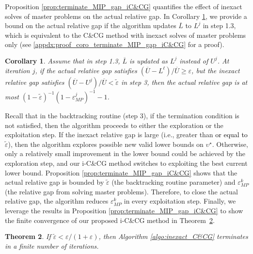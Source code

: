 \documentclass[preprint,review,11pt]{elsarticle}
\newtheorem{thm}{Theorem}
\newtheorem{cor}[thm]{Corollary}
\theoremstyle{definition}
\theoremstyle{remark}
\newcommand{\epst}{\widetilde{\varepsilon}}
\newcommand{\calO}{\mathcal{O}}
\newcommand{\Lbar}{\overline{L}}
\newcommand{\Ubar}{\overline{U}}
\newcommand{\blue}{\textcolor{black}}
\begin{document}
Proposition \ref{prop:terminate_MIP_gap_iC&CG} quantifies the effect of inexact solves of master problems on the actual relative gap. In Corollary \ref{coro:terminate_MIP_gap_iC&CG}, we provide a bound on the actual relative gap if the algorithm updates $\Lbar$ to $L^j$ in step 1.3, which is equivalent to the C\&CG method with inexact solves of master problems only \cite{Tonissen_et_al:2021} (see \ref{appdx:proof_coro_terminate_MIP_gap_iC&CG} for a proof).


\begin{cor}  \label{coro:terminate_MIP_gap_iC&CG}
Assume that in step 1.3, $\Lbar$ is updated as $L^j$ instead of $U^j$. At iteration $j$, if the actual relative gap satisfies $(\Ubar-L^\ell)/\Ubar\geq \varepsilon$, but the inexact relative gap satisfies $(\Ubar-U^j)/\Ubar<\epst$ in step 3, then the actual relative gap is at most $(1-\epst)^{-1}(1-\varepsilon_{MP}^j)^{-1}-1$.%
\end{cor}

Recall that in the backtracking routine (step 3), if the termination condition is not satisfied, then the algorithm proceeds to either the exploration or the exploitation step.  If the inexact relative gap is large (i.e., greater than \blue{or equal to} $\epst$), then the algorithm explores possible new valid lower bounds on $\upsilon^\star$.  Otherwise, only a relatively small improvement in the lower bound could be achieved by the exploration step, and our i-C\&CG method switches to exploiting the best current lower bound. Proposition \ref{prop:terminate_MIP_gap_iC&CG} shows that the actual relative gap is bounded by $\epst$ (the backtracking routine parameter) and $\varepsilon_{MP}^k$ (the relative gap from solving master problems). Therefore, to close the actual relative gap, the algorithm reduces $\varepsilon_{MP}^k$ in every exploitation step. Finally, we leverage the results in Proposition \ref{prop:terminate_MIP_gap_iC&CG} to show the finite convergence of our proposed i-C\&CG method in Theorem~\ref{thm:finite_convg_iC&CG}.


\begin{thm}  \label{thm:finite_convg_iC&CG}
If $\epst<\varepsilon/(1+\varepsilon)$, then Algorithm \ref{algo:inexact_C&CG} terminates in a finite number of iterations.
\end{thm}
\end{document}
